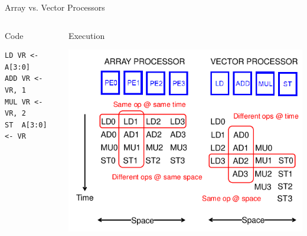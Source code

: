 \documentclass[presentation]{beamer}
\begin{document}
\begin{frame}[label={sec:org5d450e4},fragile]{Array vs. Vector Processors}
 \begin{columns}
\begin{column}{.22\columnwidth}
\begin{block}{Code}
\lstset{language=asm,label= ,caption= ,captionpos=b,numbers=none}
\begin{lstlisting}
LD VR <- A[3:0]
ADD VR <- VR, 1
MUL VR <- VR, 2
ST  A[3:0] <- VR
\end{lstlisting}
\pause
\end{block}
\end{column}
\begin{column}{.77\columnwidth}
\begin{block}{Execution}
\begin{center}
\includegraphics[width=.9\linewidth]{./images/slides_SIMD_19_small.png}
\end{center}
\end{block}
\end{column}
\end{columns}
\end{frame}
\end{document}
